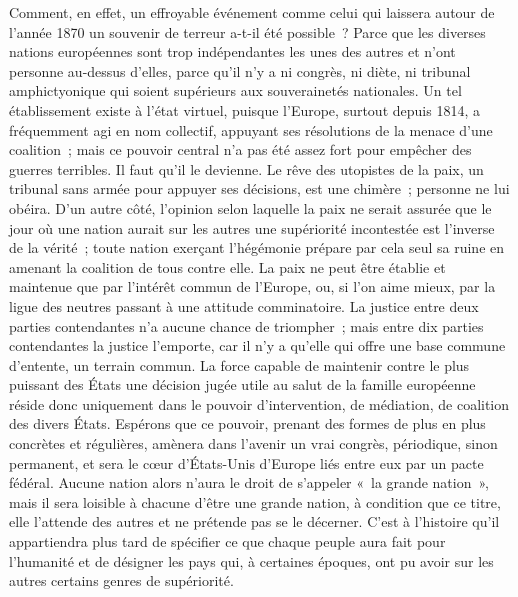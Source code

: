 \documentclass[french,twoside]{book} %
\begin{document}
Comment, en effet, un effroyable événement comme celui qui laissera autour de l’année 1870 un souvenir de terreur a-t-il été possible ? Parce que les diverses nations européennes sont trop indépendantes les unes des autres et n’ont personne au-dessus d’elles, parce qu’il n’y a ni congrès, ni diète, ni tribunal amphictyonique qui soient supérieurs aux souverainetés nationales. Un tel établissement existe à l’état virtuel, puisque l’Europe, surtout depuis 1814, a fréquemment agi en nom collectif, appuyant ses résolutions de la menace d’une coalition ; mais ce pouvoir central n’a pas été assez fort pour empêcher des guerres terribles. Il faut qu’il le devienne. Le rêve des utopistes de la paix, un tribunal sans armée pour appuyer ses décisions, est une chimère ; personne ne lui obéira. D’un autre côté, l’opinion selon laquelle la paix ne serait assurée que le jour où une nation aurait sur les autres une supériorité incontestée est l’inverse de la vérité ; toute nation exerçant l’hégémonie prépare par cela seul sa ruine en amenant la coalition de tous contre elle. La paix ne peut être établie et maintenue que par l’intérêt commun de l’Europe, ou, si l’on aime mieux, par la ligue des neutres passant à une attitude comminatoire. La justice entre deux parties contendantes n’a aucune chance de triompher ; mais entre dix parties contendantes la justice l’emporte, car il n’y a qu’elle qui offre une base commune d’entente, un terrain commun. La force capable de maintenir contre le plus puissant des États une décision jugée utile au salut de la famille européenne réside donc uniquement dans le pouvoir d’intervention, de médiation, de coalition des divers États. Espérons que ce pouvoir, prenant des formes de plus en plus concrètes et régulières, amènera dans l’avenir un vrai congrès, périodique, sinon permanent, et sera le cœur d’États-Unis d’Europe liés entre eux par un pacte fédéral. Aucune nation alors n’aura le droit de s’appeler « la grande nation », mais il sera loisible à chacune d’être une grande nation, à condition que ce titre, elle l’attende des autres et ne prétende pas se le décerner. C’est à l’histoire qu’il appartiendra plus tard de spécifier ce que chaque peuple aura fait pour l’humanité et de désigner les pays qui, à certaines époques, ont pu avoir sur les autres certains genres de supériorité.\par
\end{document}

